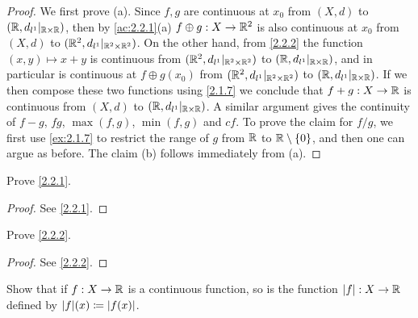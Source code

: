 \begin{proof}
  We first prove (a). Since \(f, g\) are continuous at \(x_0\) from \((X, d)\) to \((\mathbb{R}, d_{l^1}|_{\mathbb{R} \times \mathbb{R}})\), then by \cref{ac:2.2.1}(a) \(f \oplus g : X \to \mathbb{R}^2\) is also continuous at \(x_0\) from \((X, d)\) to \((\mathbb{R}^2, d_{l^1}|_{\mathbb{R}^2 \times \mathbb{R}^2})\).
  On the other hand, from \cref{2.2.2} the function \((x, y) \mapsto x + y\) is continuous from \((\mathbb{R}^2, d_{l^1}|_{\mathbb{R}^2 \times \mathbb{R}^2})\) to \((\mathbb{R}, d_{l^1}|_{\mathbb{R} \times \mathbb{R}})\), and in particular is continuous at \(f \oplus g(x_0)\) from \((\mathbb{R}^2, d_{l^1}|_{\mathbb{R}^2 \times \mathbb{R}^2})\) to \((\mathbb{R}, d_{l^1}|_{\mathbb{R} \times \mathbb{R}})\).
  If we then compose these two functions using \cref{2.1.7} we conclude that \(f + g : X \to \mathbb{R}\) is continuous from \((X, d)\) to \((\mathbb{R}, d_{l^1}|_{\mathbb{R} \times \mathbb{R}})\).
  A similar argument gives the continuity of \(f - g\), \(fg\), \(\max(f, g)\), \(\min(f, g)\) and \(cf\).
  To prove the claim for \(f / g\), we first use \cref{ex:2.1.7} to restrict the range of \(g\) from \(\mathbb{R}\) to \(\mathbb{R} \setminus \{0\}\), and then one can argue as before.
  The claim (b) follows immediately from (a).
\end{proof}

\exercisesection

\begin{ex}\label{ex:2.2.1}
  Prove \cref{2.2.1}.
\end{ex}

\begin{proof}
  See \cref{2.2.1}.
\end{proof}

\begin{ex}\label{ex:2.2.2}
  Prove \cref{2.2.2}.
\end{ex}

\begin{proof}
  See \cref{2.2.2}.
\end{proof}

\begin{ex}\label{ex:2.2.3}
  Show that if \(f : X \to \mathbb{R}\) is a continuous function, so is the function \(\left\lvert f\right\rvert : X \to \mathbb{R}\) defined by \(\abs{f}(x) \coloneqq \abs{f(x)}\).
\end{ex}

